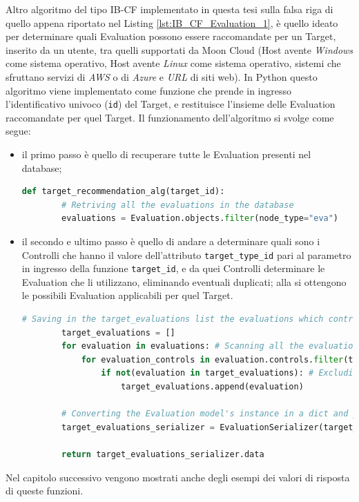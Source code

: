 %
Altro algoritmo del tipo IB-CF implementato in questa tesi sulla falsa riga di quello appena riportato nel Listing \ref{lst:IB_CF_Evaluation_1}, 
è quello ideato per determinare quali Evaluation possono essere raccomandate per un Target, inserito da un utente, tra quelli supportati da Moon Cloud
(Host avente \textit{Windows} come sistema operativo, Host avente \textit{Linux} come sistema operativo, sistemi che sfruttano 
servizi di \textit{AWS} o di \textit{Azure} e \textit{URL} di siti web).\hfill\break
In Python questo algoritmo viene implementato come funzione che prende in ingresso l'identificativo univoco (\texttt{id}) del Target, e 
restituisce l'insieme delle Evaluation raccomandate per quel Target. Il funzionamento dell'algoritmo si svolge come segue:
\begin{itemize}
    \item il primo passo è quello di recuperare tutte le Evaluation presenti nel database;
    \begin{lstlisting}[language=Python, label=lst:IB_CF_Target_1]
    def target_recommendation_alg(target_id):
        # Retriving all the evaluations in the database
        evaluations = Evaluation.objects.filter(node_type="eva")
    \end{lstlisting} 
    \item il secondo e ultimo passo è quello di andare a determinare quali sono i Controlli che hanno il valore dell'attributo \texttt{target\_type\_id} 
    pari al parametro in ingresso della funzione \texttt{target\_id}, e da quei Controlli determinare le Evaluation che li utilizzano, 
    eliminando eventuali duplicati; alla si ottengono le possibili Evaluation applicabili per quel Target.
    \begin{lstlisting}[language=Python, label=lst:IB_CF_Target_2]
        # Saving in the target_evaluations list the evaluations which controls have target_type_id equal to target_id
        target_evaluations = []
        for evaluation in evaluations: # Scanning all the evaluations
            for evaluation_controls in evaluation.controls.filter(target_type_id=target_id):
                if not(evaluation in target_evaluations): # Excluding evaluations duplicated
                    target_evaluations.append(evaluation)
        
        # Converting the Evaluation model's instance in a dict and putting the evaluation, as a dict, in a list
        target_evaluations_serializer = EvaluationSerializer(target_evaluations, many=True)
        
        return target_evaluations_serializer.data
    \end{lstlisting} 
\end{itemize}
%
Nel capitolo successivo vengono mostrati anche degli esempi dei valori di risposta di queste funzioni.
%
